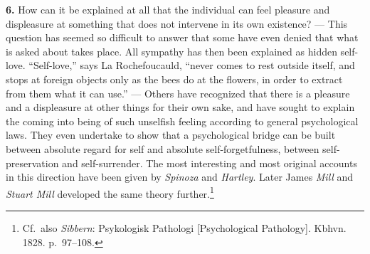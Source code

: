 \documentclass[12pt,a4paper]{book}
\newcommand{\opage}[1]{\marginnote{\footnotesize\textit{[#1]}}}
\begin{document}
\opage{294}\textbf{6.} How can it be explained at all that the individual
can feel pleasure and displeasure at something that does not intervene
in its own existence? --- This question has seemed so difficult to
answer that some have even denied that what is asked about takes place.
All sympathy has then been explained as hidden self-love. ``Self-love,''
says La Rochefoucauld, ``never comes to rest outside itself, and stops
at foreign objects only as the bees do at the flowers, in order to
extract from them what it can use.'' --- Others have recognized that
there is a pleasure and a displeasure at other things for their own
sake, and have sought to explain the coming into being of such unselfish
feeling according to general psychological laws. They even undertake to
show that a psychological bridge can be built between absolute regard
for self and absolute self-forgetfulness, between self-preservation and
self-surrender. The most interesting and most original accounts in this
direction have been given by \emph{Spinoza} and \emph{Hartley}. Later
James \emph{Mill} and \emph{Stuart Mill} developed the same theory
further.\footnote{Cf.\ also \emph{Sibbern}: Psykologisk Pathologi
[Psychological Pathology]. Kbhvn. 1828. p.~97--108.}
\end{document}
